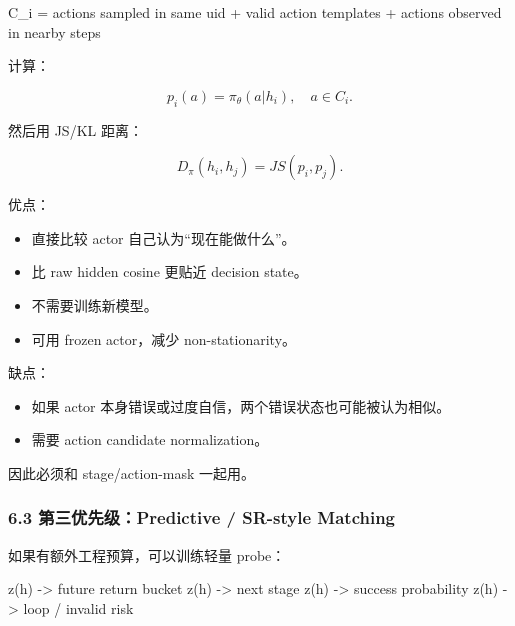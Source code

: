 \documentclass[
  10pt,
]{ctexart}
\newenvironment{Shaded}{}{}
\newcommand{\NormalTok}[1]{#1}
\providecommand{\tightlist}{%
  \setlength{\itemsep}{0pt}\setlength{\parskip}{0pt}}
\begin{document}
\begin{Shaded}
\begin{Highlighting}[]
\NormalTok{C\_i = actions sampled in same uid}
\NormalTok{      + valid action templates}
\NormalTok{      + actions observed in nearby steps}
\end{Highlighting}
\end{Shaded}

计算：

\[
p_i(a)=\pi_\theta(a|h_i),\quad a\in C_i.
\]

然后用 JS/KL 距离：

\[
D_\pi(h_i,h_j)=JS(p_i,p_j).
\]

优点：

\begin{itemize}
\tightlist
\item
  直接比较 actor 自己认为``现在能做什么''。
\item
  比 raw hidden cosine 更贴近 decision state。
\item
  不需要训练新模型。
\item
  可用 frozen actor，减少 non-stationarity。
\end{itemize}

缺点：

\begin{itemize}
\tightlist
\item
  如果 actor 本身错误或过度自信，两个错误状态也可能被认为相似。
\item
  需要 action candidate normalization。
\end{itemize}

因此必须和 stage/action-mask 一起用。

\subsubsection{6.3 第三优先级：Predictive / SR-style
Matching}\label{ux7b2cux4e09ux4f18ux5148ux7ea7predictive-sr-style-matching}

如果有额外工程预算，可以训练轻量 probe：

\begin{Shaded}
\begin{Highlighting}[]
\NormalTok{z(h) {-}\textgreater{} future return bucket}
\NormalTok{z(h) {-}\textgreater{} next stage}
\NormalTok{z(h) {-}\textgreater{} success probability}
\NormalTok{z(h) {-}\textgreater{} loop / invalid risk}
\end{Highlighting}
\end{Shaded}
\end{document}
